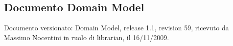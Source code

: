 \subsection{Documento Domain Model}
Documento versionato: Domain Model, release 1.1, revision 59, ricevuto da
Massimo Nocentini in ruolo di librarian, il 16/11/2009.